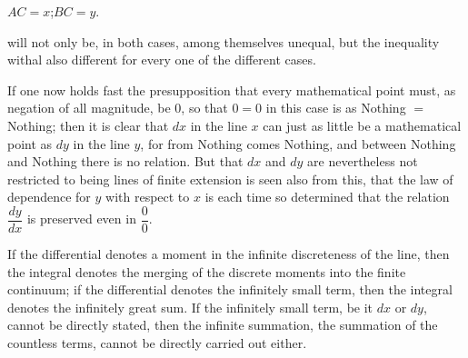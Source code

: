 \documentclass[12pt]{book}
\begin{document}
\begin{center}
\end{center}

\begin{center}
$AC = x$;\quad $BC = y$.
\end{center}

will not only be, in both cases, among themselves unequal, but
the inequality withal also different for every one of the different cases.

If one now holds fast the presupposition that every mathematical point must, as
negation of all magnitude, be 0, so that $0 = 0$ in this case is as Nothing $=$
Nothing; then it is clear that $dx$ in the line $x$ can just as little be a
mathematical point as $dy$ in the line $y$, for from Nothing comes Nothing, and
between Nothing and Nothing there is no relation. But that $dx$ and $dy$ are
nevertheless not restricted to being lines of finite extension is seen also from
this, that the law of dependence for $y$ with respect to $x$ is each time so
determined that the relation $\dfrac{dy}{dx}$ is preserved even in $\dfrac{0}{0}$.

If the differential denotes a moment in the infinite discreteness of the line, then
the integral denotes the merging of the discrete moments into the finite continuum;
if the differential denotes the infinitely small term, then the integral denotes the
infinitely great sum. If the infinitely small term, be it $dx$ or $dy$, cannot be
directly stated, then the infinite summation, the summation of the countless terms,
cannot be directly carried out either.
\end{document}
